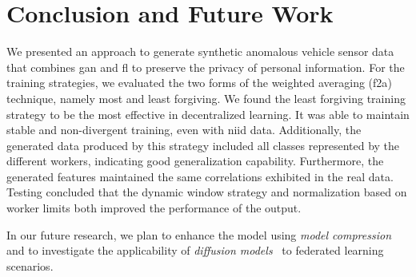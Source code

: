 \section{Conclusion and Future Work}


We presented an approach to generate synthetic anomalous vehicle sensor data that combines \gls*{gan} and \gls*{fl} to preserve the privacy of personal information. For the training strategies, %
%
we evaluated the two forms of the weighted averaging (\gls*{f2a}) technique, namely most and least forgiving. %
%
We found the least forgiving training strategy to be the most effective in decentralized learning. It was able to maintain stable and non-divergent training, even with \gls*{niid} data. Additionally, the generated data produced by this strategy included all classes represented by the different workers, indicating good generalization capability. Furthermore, the generated features maintained the same correlations exhibited in the real data.
%
Testing concluded that the dynamic window strategy and normalization based on worker limits both improved the performance of the output. 


In our future research, we plan to enhance the model using \textit{model compression}~\cite{hinton2015distilling} and to investigate the applicability of \textit{diffusion models}~\cite{alcaraz_diffusion-based_2022} to federated learning scenarios.

